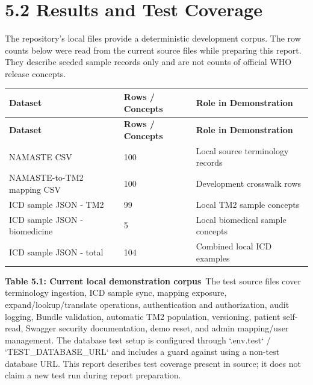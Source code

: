 \documentclass[12pt,a4paper,oneside]{report}
\begin{document}
\section*{5.2 Results and Test Coverage}
The repository's local files provide a deterministic development corpus. The row counts below were read from the current source files while preparing this report. They describe seeded sample records only and are not counts of official WHO release concepts.

\begin{longtable}{|p{}|p{}|p{}|}
\hline
\textbf{Dataset} & \textbf{Rows / Concepts} & \textbf{Role in Demonstration} \\ \hline
\endfirsthead
\hline \textbf{Dataset} & \textbf{Rows / Concepts} & \textbf{Role in Demonstration} \\ \hline\endhead
NAMASTE CSV & 100 & Local source terminology records \\ \hline
NAMASTE-to-TM2 mapping CSV & 100 & Development crosswalk rows \\ \hline
ICD sample JSON - TM2 & 99 & Local TM2 sample concepts \\ \hline
ICD sample JSON - biomedicine & 5 & Local biomedical sample concepts \\ \hline
ICD sample JSON - total & 104 & Combined local ICD examples \\ \hline
\end{longtable}
\vspace{4pt}
\smallskip\textbf{\textbf{Table 5.1: Current local demonstration corpus}}\
The test source files cover terminology ingestion, ICD sample sync, mapping exposure, expand/lookup/translate operations, authentication and authorization, audit logging, Bundle validation, automatic TM2 population, versioning, patient self-read, Swagger security documentation, demo reset, and admin mapping/user management. The database test setup is configured through `.env.test` / `TEST\_DATABASE\_URL` and includes a guard against using a non-test database URL. This report describes test coverage present in source; it does not claim a new test run during report preparation.
\end{document}
